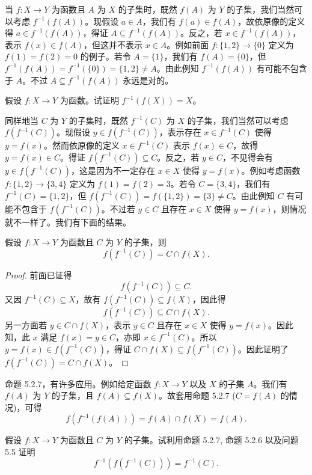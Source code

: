 当 $f : X \to Y$ 为函数且 $A$ 为 $X$ 的子集时，既然 $f(A)$ 为 $Y$ 的子集，我们当然可以考虑 $f^{-1}(f(A))$。现假设 $a \in A$，我们有 $f(a) \in f(A)$，故依原像的定义得 $a \in f^{-1}(f(A))$，得证 $A \subseteq f^{-1}(f(A))$。反之，若 $x \in f^{-1}(f(A))$，表示 $f(x) \in f(A)$，但这并不表示 $x \in A$。例如前面 $f : \{1, 2\} \to \{0\}$ 定义为 $f(1) = f(2) = 0$ 的例子。若令 $A = \{1\}$，我们有 $f(A) = \{0\}$，但 $f^{-1}(f(A)) = f^{-1}(\{0\}) = \{1, 2\} \neq A$。由此例知 $f^{-1}(f(A))$ 有可能不包含于 $A$。不过 $A \subseteq f^{-1}(f(A))$ 永远是对的。

\begin{question}
假设 $f : X \to Y$ 为函数。试证明 $f^{-1}(f(X)) = X$。
\end{question}

同样地当 $C$ 为 $Y$ 的子集时，既然 $f^{-1}(C)$ 为 $X$ 的子集，我们当然可以考虑 $f(f^{-1}(C))$。现假设 $y \in f(f^{-1}(C))$，表示存在 $x \in f^{-1}(C)$ 使得 $y = f(x)$。然而依原像的定义 $x \in f^{-1}(C)$ 表示 $f(x) \in C$，故得 $y = f(x) \in C$。得证 $f(f^{-1}(C)) \subseteq C$。反之，若 $y \in C$，不见得会有 $y \in f(f^{-1}(C))$，这是因为不一定存在 $x \in X$ 使得 $y = f(x)$。例如考虑函数 $f : \{1, 2\} \to \{3, 4\}$ 定义为 $f(1) = f(2) = 3$。若令 $C = \{3, 4\}$，我们有 $f^{-1}(C) = \{1, 2\}$，但 $f(f^{-1}(C)) = f(\{1, 2\}) = \{3\} \neq C$。由此例知 $C$ 有可能不包含于 $f(f^{-1}(C))$。不过若 $y \in C$ 且存在 $x \in X$ 使得 $y = f(x)$，则情况就不一样了。我们有下面的结果。

\begin{proposition}
假设 $f : X \to Y$ 为函数且 $C$ 为 $Y$ 的子集，则
$$ f(f^{-1}(C)) = C \cap f(X). $$
\end{proposition}

\begin{proof}
前面已证得
$$ f(f^{-1}(C)) \subseteq C. $$
又因 $f^{-1}(C) \subseteq X$，故有 $f(f^{-1}(C)) \subseteq f(X)$，因此得
$$ f(f^{-1}(C)) \subseteq C \cap f(X). $$
另一方面若 $y \in C \cap f(X)$，表示 $y \in C$ 且存在 $x \in X$ 使得 $y = f(x)$。因此知，此 $x$ 满足 $f(x) = y \in C$，亦即 $x \in f^{-1}(C)$。所以 $y = f(x) \in f(f^{-1}(C))$，得证 $C \cap f(X) \subseteq f(f^{-1}(C))$。因此证明了 $f(f^{-1}(C)) = C \cap f(X)$。
\end{proof}

命题 5.2.7，有许多应用。例如给定函数 $f : X \to Y$ 以及 $X$ 的子集 $A$。我们有 $f(A)$ 为 $Y$ 的子集，且 $f(A) \subseteq f(X)$。故套用命题 5.2.7 ($C = f(A)$ 的情况)，可得
$$ f(f^{-1}(f(A))) = f(A) \cap f(X) = f(A). $$

\begin{question}
假设 $f : X \to Y$ 为函数且 $C$ 为 $Y$ 的子集。试利用命题 5.2.7, 命题 5.2.6 以及问题 5.5 证明
$$ f^{-1}(f(f^{-1}(C))) = f^{-1}(C). $$
\end{question}

